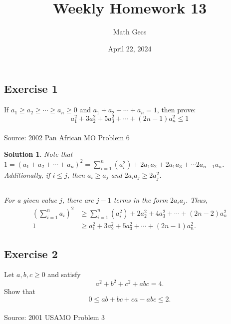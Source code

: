 \documentclass[12pt]{article}
\title{Weekly Homework 13}
\author{Math Gecs}
\date{April 22, 2024}
\newtheorem*{solution*}{Solution}
\begin{document}
\maketitle

\subsection*{Exercise 1}
If $a_1 \geq a_2 \geq \cdots \geq a_n \geq 0$ and $a_1+a_2+\cdots+a_n=1$, then prove:
$$a_1^2+3a_2^2+5a_3^2+ \cdots +(2n-1)a_n^2 \leq 1$$
\\

Source: 2002 Pan African MO Problem 6\\

\begin{solution*}
Note that $1 = (a_1 + a_2 + \cdots + a_n)^2 = \sum_{i=1}^{n} (a_i^2) + 2a_1a_2 + 2a_1a_3 + \cdots 2a_{n-1}a_n$.  Additionally, if $i \le j$, then $a_i \ge a_j$ and $2a_i a_j \ge 2a_j^2$.

$$$$

For a given value $j$, there are $j-1$ terms in the form $2a_ia_j$.  Thus,
$$\begin{align*}
(\sum_{i=1}^n a_i)^2 &\ge \sum_{i=1}^{n} (a_i^2) + 2a_2^2 + 4a_3^2 + \cdots + (2n-2)a_n^2 \\
1 &\ge a_1^2 + 3a_2^2 + 5a_3^2 + \cdots + (2n-1)a_n^2.
\end{align*}$$

\end{solution*}

\vspace{2in}






\subsection*{Exercise 2}
Let $a, b, c \geq 0$ and satisfy
$$a^2 + b^2 + c^2 + abc = 4.$$
Show that
$$0 \le ab + bc + ca - abc \leq 2.$$\\

Source: 2001 USAMO Problem 3\\
\end{document}
